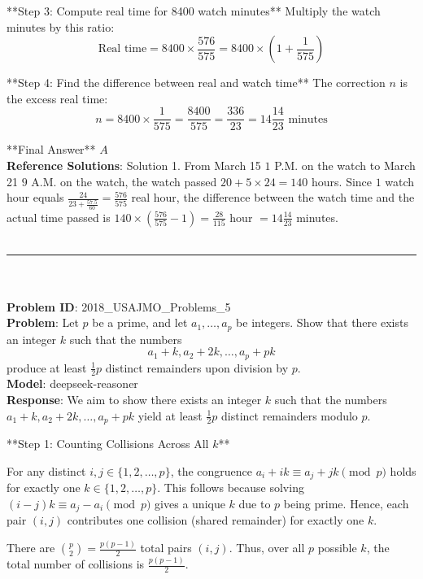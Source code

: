 {**Step 3: Compute real time for 8400 watch minutes**  
Multiply the watch minutes by this ratio:  
\[
\text{Real time} = 8400 \times \frac{576}{575} = 8400 \times \left(1 + \frac{1}{575}\right)
\]

**Step 4: Find the difference between real and watch time**  
The correction \(n\) is the excess real time:  
\[
n = 8400 \times \frac{1}{575} = \frac{8400}{575} = \frac{336}{23} = 14 \frac{14}{23} \text{ minutes}
\]

**Final Answer**  
\(\boxed{A}\) \\
    \textbf{Reference Solutions}: Solution 1. From March 15 $1$ P.M. on the watch to March 21 $9$ A.M. on the watch, the watch passed $20 + 5 \times 24 = 140$ hours. 
Since $1$ watch hour equals $\frac{24}{23 + \frac{57.5}{60}} = \frac{576}{575}$ real hour, the difference between the watch time and the actual time passed is $140 \times \left( \frac{576}{575} - 1 \right) = \frac{28}{115}$ hour $=14\frac{14}{23}$ minutes. \\
    \vspace{0.3cm} \\
    \hrule \\
    \vspace{0.5cm} \\
    \textbf{Problem ID}: 2018_USAJMO_Problems_5 \\
    \textbf{Problem}: Let $p$ be a prime, and let $a_1, \dots, a_p$ be integers. Show that there exists an integer $k$ such that the numbers \[a_1 + k, a_2 + 2k, \dots, a_p + pk\]produce at least $\tfrac{1}{2} p$ distinct remainders upon division by $p$. \\
    \textbf{Model}: deepseek-reasoner \\
    \textbf{Response}: We aim to show there exists an integer \( k \) such that the numbers \( a_1 + k, a_2 + 2k, \dots, a_p + pk \) yield at least \( \frac{1}{2}p \) distinct remainders modulo \( p \).

**Step 1: Counting Collisions Across All \( k \)**

For any distinct \( i, j \in \{1, 2, \dots, p\} \), the congruence \( a_i + ik \equiv a_j + jk \pmod{p} \) holds for exactly one \( k \in \{1, 2, \dots, p\} \). This follows because solving \( (i - j)k \equiv a_j - a_i \pmod{p} \) gives a unique \( k \) due to \( p \) being prime. Hence, each pair \( (i, j) \) contributes one collision (shared remainder) for exactly one \( k \).

There are \( \binom{p}{2} = \frac{p(p-1)}{2} \) total pairs \( (i, j) \). Thus, over all \( p \) possible \( k \), the total number of collisions is \( \frac{p(p-1)}{2} \).

}
